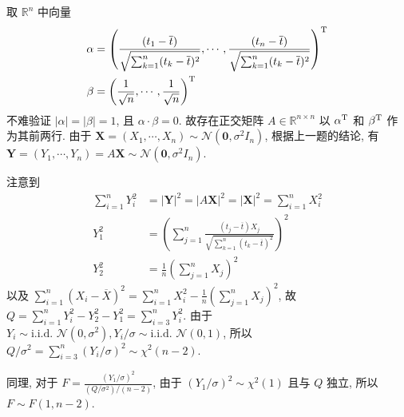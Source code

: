 \documentclass[8pt]{article}
\theoremstyle{compact}
\begin{document}
取 $\mathbb R^n$ 中向量 \begin{equation*}
	\begin{split}
		\alpha &= \left(\frac{(t_1 - \overline{t})}{\sqrt{\sum_{k=1}^{n}(t_k - \overline{t})^2}}, \cdots, \frac{(t_n - \overline{t})}{\sqrt{\sum_{k=1}^{n}(t_k - \overline{t})^2}}\right)^{\text T} \\
		\beta &= \left(\frac1{\sqrt n}, \cdots, \frac1{\sqrt n} \right)^{\text T}
	\end{split}
\end{equation*}
不难验证 $|\alpha| = |\beta| = 1$, 且 $\alpha \cdot \beta = 0$. 故存在正交矩阵 $A \in \mathbb R^{n \times n}$ 以 $\alpha^{\text T}$ 和 $\beta^{\text T}$ 作为其前两行. 由于 $\mathbf X = (X_1, \cdots, X_n) \sim \mathcal N(\mathbf 0, \sigma^2I_n)$, 根据上一题的结论, 有 $\mathbf Y = (Y_1, \cdots, Y_n) = A\mathbf X \sim \mathcal N(\mathbf 0, \sigma^2I_n)$.

注意到 \begin{equation*}
	\begin{split}
		\sum_{i=1}^n Y_i^2 &= |\mathbf Y|^2 = |A\mathbf X|^2 = |\mathbf X|^2 = \sum_{i=1}^n X_i^2 \\
		Y_1^2 &= \left(\sum\limits_{j=1}^{n}\frac{(t_j - \overline{t})X_j}{\sqrt{\sum_{k=1}^{n}(t_k - \overline{t})^2}}\right)^2 \\
		Y_2^2 &= \frac1n \left(\sum_{j=1}^nX_j\right)^2
	\end{split}
\end{equation*}
以及 $\sum\limits_{i=1}^{n}(X_i - \overline{X})^2 = \sum\limits_{i=1}^n X_i^2 - \frac1n \left(\sum\limits_{j=1}^nX_j\right)^2$, 故 $Q = \sum\limits_{i=1}^n Y_i^2 - Y_2^2 - Y_1^2 = \sum\limits_{i=3}^n Y_i^2$. 由于 $Y_i \sim \text{i.i.d. } \mathcal N(0, \sigma^2), Y_i / \sigma \sim \text{i.i.d. } \mathcal N(0, 1)$, 所以 $Q / \sigma^2 = \sum\limits_{i=3}^n (Y_i / \sigma)^2 \sim \chi^2(n - 2)$.

同理, 对于 $F = \frac{(Y_1 / \sigma)^2}{(Q / \sigma^2) / (n - 2)}$, 由于 $(Y_1 / \sigma)^2 \sim \chi^2(1)$ 且与 $Q$ 独立, 所以 $F \sim F(1, n - 2)$.
\end{document}
